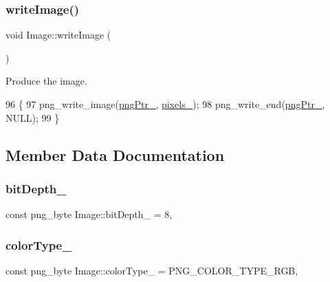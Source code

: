 \subsubsection{\texorpdfstring{write\+Image()}{writeImage()}}
{\footnotesize\ttfamily void Image\+::write\+Image (\begin{DoxyParamCaption}{ }\end{DoxyParamCaption})}



Produce the image. 


\begin{DoxyCode}
96                        \{
97     png\_write\_image(\mbox{\hyperlink{class_image_aaf607d2596bac09b13370599d9ba6d8c}{pngPtr\_}}, \mbox{\hyperlink{class_image_a51351c8507499d09cb9667c20ef01faf}{pixels\_}});
98     png\_write\_end(\mbox{\hyperlink{class_image_aaf607d2596bac09b13370599d9ba6d8c}{pngPtr\_}}, NULL);
99 \}
\end{DoxyCode}


\subsection{Member Data Documentation}
\mbox{\label{class_image_ae472f0390f64eb5d49f858ce95e09ce8}} 
\subsubsection{\texorpdfstring{bit\+Depth\+\_\+}{bitDepth\_}}
{\footnotesize\ttfamily const png\+\_\+byte Image\+::bit\+Depth\+\_\+ = 8\hspace{0.3cm}{\ttfamily [static]}, {\ttfamily [private]}}

\mbox{\label{class_image_a94b0dece808a9f06ebb6f4394e8e3048}} 
\subsubsection{\texorpdfstring{color\+Type\+\_\+}{colorType\_}}
{\footnotesize\ttfamily const png\+\_\+byte Image\+::color\+Type\+\_\+ = P\+N\+G\+\_\+\+C\+O\+L\+O\+R\+\_\+\+T\+Y\+P\+E\+\_\+\+R\+GB\hspace{0.3cm}{\ttfamily [static]}, {\ttfamily [private]}}

